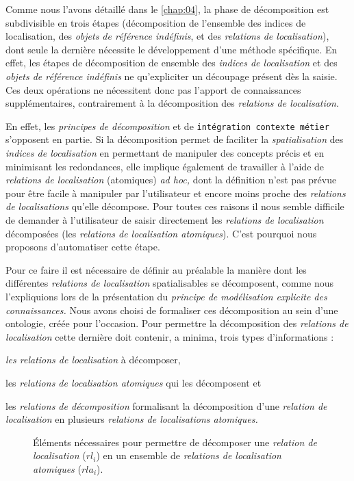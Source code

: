 Comme nous l'avons détaillé dans le \autoref{chap:04}, la phase de
décomposition est subdivisible en trois étapes (décomposition de
l'ensemble des indices de localisation, des \emph{objets de référence
  indéfinis}, et des \emph{relations de localisation}), dont seule la
dernière nécessite le développement d'une méthode spécifique. En
effet, les étapes de décomposition de ensemble des \emph{indices de
  localisation} et des \emph{objets de référence indéfinis} ne
qu'expliciter un découpage présent dès la saisie. Ces deux opérations
ne nécessitent donc pas l'apport de connaissances supplémentaires,
contrairement à la décomposition des \emph{relations de localisation.}

En effet, les \emph{principes de décomposition} et de
\texttt{intégration contexte métier} s'opposent en partie. Si la
décomposition permet de faciliter la \emph{spatialisation} des
\emph{indices de localisation} en permettant de manipuler des concepts
précis et en minimisant les redondances, elle implique également de
travailler à l'aide de \emph{relations de localisation} (atomiques)
\emph{ad hoc,} dont la définition n'est pas prévue pour être facile à
manipuler par l'utilisateur et encore moins proche des \emph{relations
  de localisations} qu'elle décompose. Pour toutes ces raisons il nous
semble difficile de demander à l'utilisateur de saisir directement les
\emph{relations de localisation} décomposées (\ie les \emph{relations
  de localisation atomiques}). C'est pourquoi nous proposons
d'automatiser cette étape.

Pour ce faire il est nécessaire de définir au préalable la manière
dont les différentes \emph{relations de localisation} spatialisables
se décomposent, comme nous l'expliquions lors de la présentation du
\emph{principe de modélisation explicite des connaissances.} Nous
avons choisi de formaliser ces décomposition au sein d'une ontologie,
créée pour l'occasion. Pour permettre la décomposition des \emph{relations
de localisation} cette dernière doit contenir, a minima, trois types
d'informations :
%
\begin{enumerate*}[label=(\alph*)]
\item \emph{les relations de localisation} à décomposer,
\item les \emph{relations de localisation atomiques} qui les
  décomposent et
\item les \emph{relations de décomposition} formalisant la
  décomposition d'une \emph{relation de localisation} en plusieurs
  \emph{relations de localisations atomiques.}
\end{enumerate*}

\begin{figure}
  \centering
   
  \caption{Éléments nécessaires pour permettre de décomposer une
    \emph{relation de localisation} ($rl_i$) en un ensemble de
    \emph{relations de localisation atomiques} ($rla_i$).}
  \label{fig:onto_min_struct}
\end{figure}



